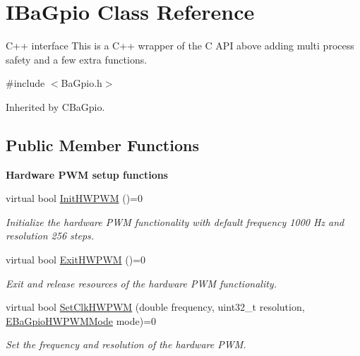 \hypertarget{classIBaGpio}{}\section{I\+Ba\+Gpio Class Reference}
\label{classIBaGpio}


C++ interface This is a C++ wrapper of the C A\+PI above adding multi process safety and a few extra functions.  




{\ttfamily \#include $<$Ba\+Gpio.\+h$>$}



Inherited by C\+Ba\+Gpio.

\subsection*{Public Member Functions}
\begin{Indent}{\bf Hardware P\+WM setup functions}\par
\begin{DoxyCompactItemize}
\item 
virtual bool \hyperlink{classIBaGpio_af8f837eef2a5db810723753d2ddfec0b}{Init\+H\+W\+P\+WM} ()=0
\begin{DoxyCompactList}\small\item\em Initialize the hardware P\+WM functionality with default frequency 1000 Hz and resolution 256 steps. \end{DoxyCompactList}\item 
virtual bool \hyperlink{classIBaGpio_a0a1ef586b8d8786802b4535709dfd288}{Exit\+H\+W\+P\+WM} ()=0
\begin{DoxyCompactList}\small\item\em Exit and release resources of the hardware P\+WM functionality. \end{DoxyCompactList}\item 
virtual bool \hyperlink{classIBaGpio_a598f466d00fe7f82b620e1b22afbd599}{Set\+Clk\+H\+W\+P\+WM} (double frequency, uint32\+\_\+t resolution, \hyperlink{BaGpio_8h_a63be35fa967e6932fc65444ce4a97f1f}{E\+Ba\+Gpio\+H\+W\+P\+W\+M\+Mode} mode)=0
\begin{DoxyCompactList}\small\item\em Set the frequency and resolution of the hardware P\+WM. \end{DoxyCompactList}\end{DoxyCompactItemize}
\end{Indent}
